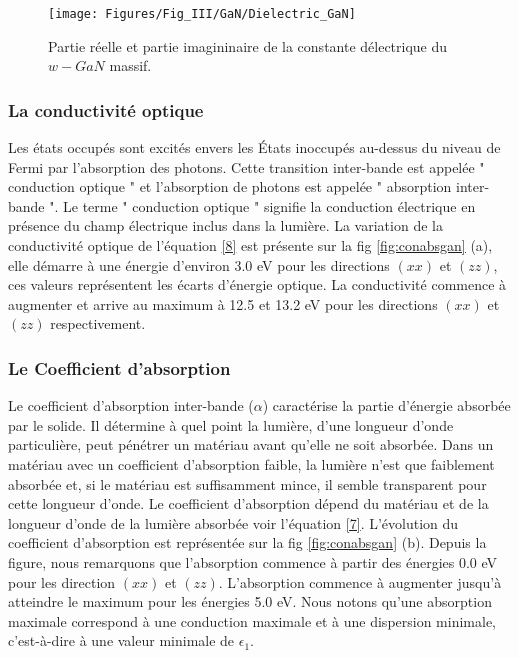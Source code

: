 \begin{figure}[h!]
	\centering
	\texttt{[image: Figures/Fig\_III/GaN/Dielectric\_GaN]}
	\caption{Partie réelle et partie imagininaire de la constante délectrique du $ w-GaN $ massif.}
	\label{fig:dielectricgan}
\end{figure}

\FloatBarrier

\subsubsection{La conductivité optique}

Les états occupés sont excités envers les États inoccupés au-dessus du niveau de Fermi par l'absorption des photons. Cette transition inter-bande est appelée " conduction optique " et l'absorption de photons est appelée " absorption inter-bande ". Le terme " conduction optique " signifie la conduction électrique en présence du champ électrique inclus dans la lumière. La variation de la conductivité optique de l'équation \eqref{8} est présente sur la fig \ref{fig:conabsgan} (a), elle démarre à une énergie d’environ 3.0 eV pour les directions $ (xx) $ et $ (zz) $, ces valeurs représentent les écarts d’énergie optique. La conductivité commence à augmenter et arrive au maximum à 12.5 et 13.2 eV pour les directions $ (xx) $ et $ (zz) $ respectivement.

\subsubsection{Le Coefficient d'absorption}

Le coefficient d'absorption inter-bande ($\alpha$) caractérise la partie d'énergie absorbée par le solide. Il détermine à quel point la lumière, d'une longueur d'onde particulière, peut pénétrer un matériau avant qu'elle ne soit absorbée. Dans un matériau avec un coefficient d'absorption faible, la lumière n'est que faiblement absorbée et, si le matériau est suffisamment mince, il semble transparent pour cette longueur d'onde. Le coefficient d'absorption dépend du matériau et de la longueur d'onde de la lumière absorbée voir l'équation \eqref{7}. L'évolution du coefficient d'absorption est représentée sur la fig \ref{fig:conabsgan} (b). Depuis la figure, nous remarquons que l'absorption commence à partir des énergies 0.0 eV pour les direction $ (xx) $ et $ (zz) $. L'absorption commence à augmenter jusqu'à atteindre le maximum pour les énergies 5.0 eV. Nous notons qu'une absorption maximale correspond à une conduction maximale et à une dispersion minimale, c'est-à-dire à une valeur minimale de $ \epsilon_{1}$.

